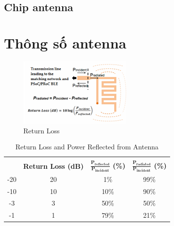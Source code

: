         \subsection{Chip antenna}

    \section{Thông số antenna}
        \begin{figure}[h]
            \centering
            \includegraphics[width=0.5\textwidth]{figures/return_loss_antenna.png}
            \caption{Return Loss}
            \label{fig:return_loss_antenna}
        \end{figure}

        
        \begin{table}[h]
            \centering
            \begin{tabular}{|c|c|c|c|}
                \hline
                \rowcolor{TLgreen!50}
                &   &   &   \\
                \arrayrulecolor{TLgreen!50}
                \cline{1-4}
                \arrayrulecolor{black}
                \multirow{-2}{*}{\cellcolor{TLgreen!50}$\mathbf{S_{11}}$}  &   \multirow{-2}{*}{\cellcolor{TLgreen!50}\textbf{Return Loss (dB)}}  &   \multirow{-2}{*}{\cellcolor{TLgreen!50}\textbf{$\mathbf{\frac{P_{reflected}}{P_{incident}}}$ (\%)}}    &   \multirow{-2}{*}{\cellcolor{TLgreen!50}\textbf{$\mathbf{\frac{P_{radiated}}{P_{incident}}}$ (\%)}} \\\hline
                -20 &   20 &   1\%  &   99\% \\\hline
                -10 &   10 &   10\% &   90\% \\\hline
                -3  &   3  &   50\% &   50\% \\\hline
                -1  &   1  &   79\% &   21\% \\\hline
            \end{tabular}
            \caption{Return Loss and Power Reflected from Antenna}
            \label{tab:return_loss_antenna}
        \end{table}